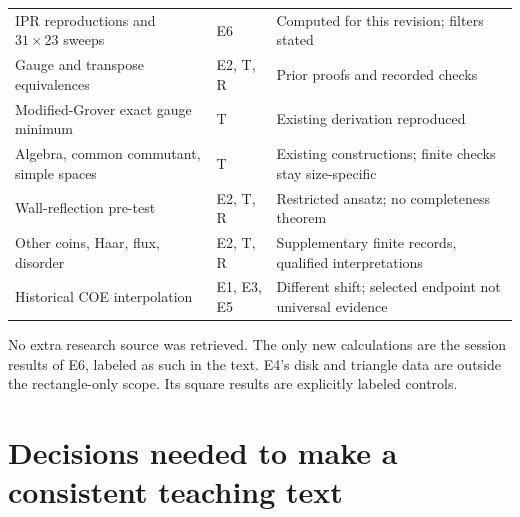 \documentclass[11pt,a4paper,oneside]{report}
\numberwithin{equation}{chapter}
\begin{document}
\begin{longtable}{@{}>{\raggedright\arraybackslash}p{}>{\raggedright\arraybackslash}p{}>{\raggedright\arraybackslash}p{}@{}}
IPR reproductions and \(31\times23\) sweeps & E6 & Computed for this revision; filters stated\\
Gauge and transpose equivalences & E2, T, R & Prior proofs and recorded checks\\
Modified-Grover exact gauge minimum & T & Existing derivation reproduced\\
Algebra, common commutant, simple spaces & T & Existing constructions; finite checks stay size-specific\\
Wall-reflection pre-test & E2, T, R & Restricted ansatz; no completeness theorem\\
Other coins, Haar, flux, disorder & E2, T, R & Supplementary finite records, qualified interpretations\\
Historical COE interpolation & E1, E3, E5 & Different shift; selected endpoint not universal evidence\\\bottomrule
\end{longtable}
No extra research source was retrieved. The only new calculations are
the session results of E6, labeled as such in the text. E4's disk and triangle data are outside the rectangle-only scope.
Its square results are explicitly labeled controls.

\section{Decisions needed to make a consistent teaching text}
\end{document}

